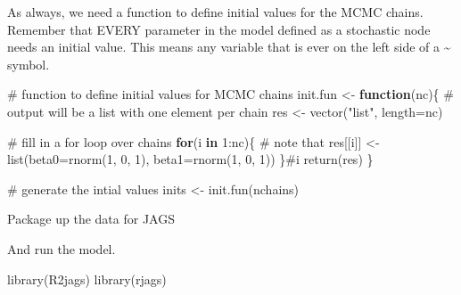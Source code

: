 \documentclass[
  13,
  letterpaper,
]{report}
\newenvironment{Shaded}{\begin{snugshade}}{\end{snugshade}}
\newcommand{\AttributeTok}[1]{\textcolor[rgb]{0.40,0.45,0.13}{#1}}
\newcommand{\CommentTok}[1]{\textcolor[rgb]{0.37,0.37,0.37}{#1}}
\newcommand{\ControlFlowTok}[1]{\textcolor[rgb]{0.00,0.23,0.31}{\textbf{#1}}}
\newcommand{\DecValTok}[1]{\textcolor[rgb]{0.68,0.00,0.00}{#1}}
\newcommand{\FunctionTok}[1]{\textcolor[rgb]{0.28,0.35,0.67}{#1}}
\newcommand{\NormalTok}[1]{\textcolor[rgb]{0.00,0.23,0.31}{#1}}
\newcommand{\OtherTok}[1]{\textcolor[rgb]{0.00,0.23,0.31}{#1}}
\newcommand{\SpecialCharTok}[1]{\textcolor[rgb]{0.37,0.37,0.37}{#1}}
\newcommand{\StringTok}[1]{\textcolor[rgb]{0.13,0.47,0.30}{#1}}
\begin{document}
As always, we need a function to define initial values for the MCMC
chains. Remember that EVERY parameter in the model defined as a
stochastic node needs an initial value. This means any variable that is
ever on the left side of a \textasciitilde{} symbol.

\begin{Shaded}
\begin{Highlighting}[]
\CommentTok{\# function to define initial values for MCMC chains}
\NormalTok{init.fun }\OtherTok{\textless{}{-}} \ControlFlowTok{function}\NormalTok{(nc)\{}
  \CommentTok{\# output will be a list with one element per chain}
\NormalTok{  res }\OtherTok{\textless{}{-}} \FunctionTok{vector}\NormalTok{(}\StringTok{"list"}\NormalTok{, }\AttributeTok{length=}\NormalTok{nc)}
  
  \CommentTok{\# fill in a for loop over chains}
  \ControlFlowTok{for}\NormalTok{(i }\ControlFlowTok{in} \DecValTok{1}\SpecialCharTok{:}\NormalTok{nc)\{}
    \CommentTok{\# note that }
\NormalTok{    res[[i]] }\OtherTok{\textless{}{-}} \FunctionTok{list}\NormalTok{(}\AttributeTok{beta0=}\FunctionTok{rnorm}\NormalTok{(}\DecValTok{1}\NormalTok{, }\DecValTok{0}\NormalTok{, }\DecValTok{1}\NormalTok{),}
                     \AttributeTok{beta1=}\FunctionTok{rnorm}\NormalTok{(}\DecValTok{1}\NormalTok{, }\DecValTok{0}\NormalTok{, }\DecValTok{1}\NormalTok{))}
\NormalTok{  \}}\CommentTok{\#i}
  \FunctionTok{return}\NormalTok{(res)}
\NormalTok{\}}

\CommentTok{\# generate the intial values}
\NormalTok{inits }\OtherTok{\textless{}{-}} \FunctionTok{init.fun}\NormalTok{(nchains)}
\end{Highlighting}
\end{Shaded}

Package up the data for JAGS

\begin{Shaded}
\end{Shaded}

And run the model.

\begin{Shaded}
\begin{Highlighting}[]
\FunctionTok{library}\NormalTok{(R2jags)}
\FunctionTok{library}\NormalTok{(rjags)}
\end{Highlighting}
\end{Shaded}
\end{document}
